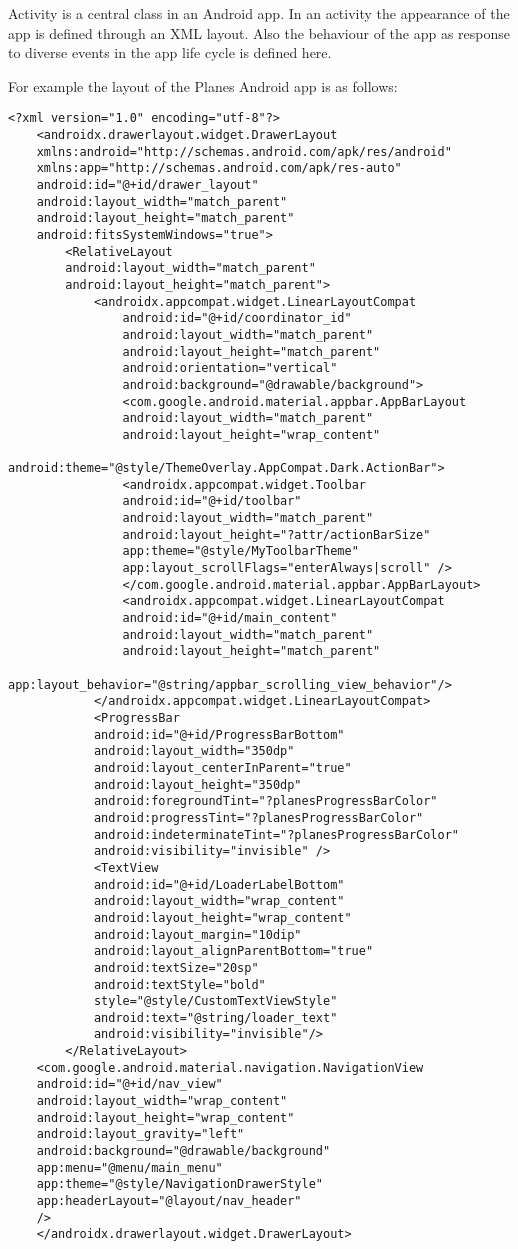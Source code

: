 Activity is a central class in an Android app. In an activity the appearance of the app is defined through an XML layout. Also the behaviour of the app as response to diverse events in the app life cycle is defined here.

For example the layout of the Planes Android app is as follows:

\begin{lstlisting}
<?xml version="1.0" encoding="utf-8"?>
	<androidx.drawerlayout.widget.DrawerLayout
	xmlns:android="http://schemas.android.com/apk/res/android"
	xmlns:app="http://schemas.android.com/apk/res-auto"
	android:id="@+id/drawer_layout"
	android:layout_width="match_parent"
	android:layout_height="match_parent"
	android:fitsSystemWindows="true">
		<RelativeLayout
		android:layout_width="match_parent"
		android:layout_height="match_parent">
			<androidx.appcompat.widget.LinearLayoutCompat
				android:id="@+id/coordinator_id"
				android:layout_width="match_parent"
				android:layout_height="match_parent"
				android:orientation="vertical"
				android:background="@drawable/background">
				<com.google.android.material.appbar.AppBarLayout
				android:layout_width="match_parent"
				android:layout_height="wrap_content"
				android:theme="@style/ThemeOverlay.AppCompat.Dark.ActionBar">
				<androidx.appcompat.widget.Toolbar
				android:id="@+id/toolbar"
				android:layout_width="match_parent"
				android:layout_height="?attr/actionBarSize"
				app:theme="@style/MyToolbarTheme"
				app:layout_scrollFlags="enterAlways|scroll" />
				</com.google.android.material.appbar.AppBarLayout>
				<androidx.appcompat.widget.LinearLayoutCompat
				android:id="@+id/main_content"
				android:layout_width="match_parent"
				android:layout_height="match_parent"
				app:layout_behavior="@string/appbar_scrolling_view_behavior"/>
			</androidx.appcompat.widget.LinearLayoutCompat>
			<ProgressBar
			android:id="@+id/ProgressBarBottom"
			android:layout_width="350dp"
			android:layout_centerInParent="true"
			android:layout_height="350dp"
			android:foregroundTint="?planesProgressBarColor"
			android:progressTint="?planesProgressBarColor"
			android:indeterminateTint="?planesProgressBarColor"
			android:visibility="invisible" />
			<TextView
			android:id="@+id/LoaderLabelBottom"
			android:layout_width="wrap_content"
			android:layout_height="wrap_content"
			android:layout_margin="10dip"
			android:layout_alignParentBottom="true"
			android:textSize="20sp"
			android:textStyle="bold"
			style="@style/CustomTextViewStyle"
			android:text="@string/loader_text"
			android:visibility="invisible"/>
		</RelativeLayout>
	<com.google.android.material.navigation.NavigationView
	android:id="@+id/nav_view"
	android:layout_width="wrap_content"
	android:layout_height="wrap_content"
	android:layout_gravity="left"
	android:background="@drawable/background"
	app:menu="@menu/main_menu"
	app:theme="@style/NavigationDrawerStyle"
	app:headerLayout="@layout/nav_header"
	/>
	</androidx.drawerlayout.widget.DrawerLayout>
\end{lstlisting}
 
